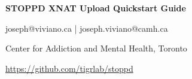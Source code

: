 \documentclass[a4paper,11pt,oneside]{book}
\begin{document}


\noindent
\begin{minipage}{\textwidth}

    \vspace{0.1in} 
    \begin{multicols}{2}
        
		\vspace*{\fill}
		\large\textbf{STOPPD XNAT Upload Quickstart Guide}
		\vspace*{\fill}

        \columnbreak
        \normalsize

        \hfill joseph@viviano.ca | joseph.viviano@camh.ca

        \hfill Center for Addiction and Mental Health, Toronto\
        
        \hfill \url{https://github.com/tigrlab/stoppd}\

    \end{multicols}
    \vspace{0in}
\end{minipage}
\end{document}
